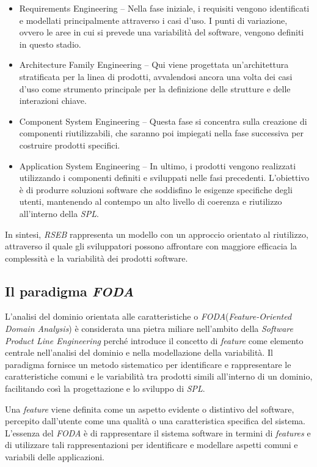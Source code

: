 \documentclass[12pt]{report}
\newcommand{\spl}{\textsl{SPL}\xspace}
\newcommand{\rseb}{\textsl{RSEB}\xspace}
\newcommand{\foda}{\textsl{FODA}\xspace}
\begin{document}
\begin{itemize}
\item \textsf{Requirements Engineering} -- Nella fase iniziale, i requisiti vengono identificati e modellati principalmente attraverso i casi d'uso. I punti di variazione, ovvero le aree in cui si prevede una variabilità del software, vengono definiti in questo stadio.
\item \textsf{Architecture Family Engineering} -- Qui viene progettata un'architettura stratificata per la linea di prodotti, avvalendosi ancora una volta dei casi d'uso come strumento principale per la definizione delle strutture e delle interazioni chiave.
\item \textsf{Component System Engineering} -- Questa fase si concentra sulla creazione di componenti riutilizzabili, che saranno poi impiegati nella fase successiva per costruire prodotti specifici.
\item \textsf{Application System Engineering} -- In ultimo, i prodotti vengono realizzati utilizzando i componenti definiti e sviluppati nelle fasi precedenti. L'obiettivo è di produrre soluzioni software che soddisfino le esigenze specifiche degli utenti, mantenendo al contempo un alto livello di coerenza e riutilizzo all'interno della \spl.
\end{itemize}

In sintesi, \rseb rappresenta un modello con un approccio orientato al riutilizzo, attraverso il quale gli sviluppatori possono affrontare con maggiore efficacia la complessità e la variabilità dei prodotti software.


\subsection{Il paradigma \foda}
L'analisi del dominio orientata alle caratteristiche o \foda (\textit{Feature-Oriented Domain Analysis}) \cite{kang:cohen:hess:nowak:peters}
è considerata una pietra miliare nell'ambito della \textit{Software Product Line Engineering} perché introduce il concetto di \textit{feature} come elemento centrale nell'analisi del dominio e nella modellazione della variabilità. Il paradigma fornisce un metodo sistematico per identificare e rappresentare le caratteristiche comuni e le variabilità tra prodotti simili all'interno di un dominio, facilitando così la progettazione e lo sviluppo di \spl.

Una \textit{feature} viene definita come un aspetto evidente o distintivo del software, percepito dall'utente come una qualità o una caratteristica specifica del sistema. L'essenza del \foda è di rappresentare il sistema software in termini di \textit{features} e di utilizzare tali rappresentazioni per identificare e modellare aspetti comuni e variabili delle applicazioni.
\end{document}
